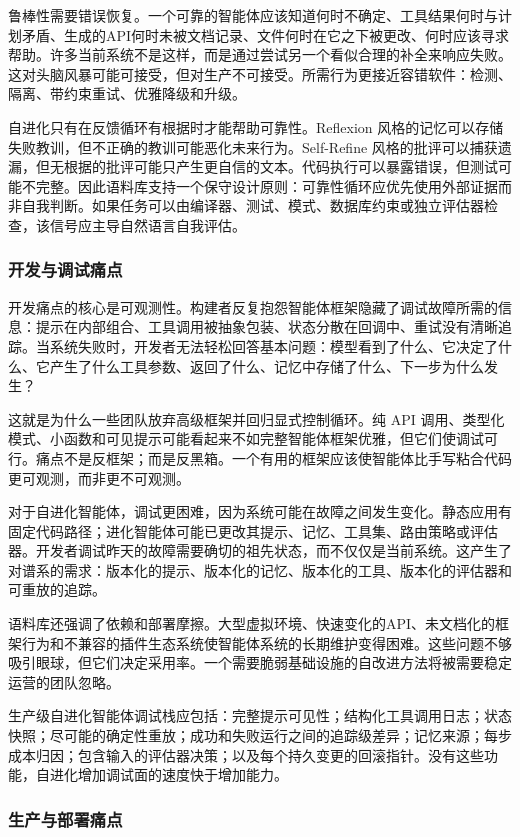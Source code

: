 鲁棒性需要错误恢复。一个可靠的智能体应该知道何时不确定、工具结果何时与计划矛盾、生成的API何时未被文档记录、文件何时在它之下被更改、何时应该寻求帮助。许多当前系统不是这样，而是通过尝试另一个看似合理的补全来响应失败。这对头脑风暴可能可接受，但对生产不可接受。所需行为更接近容错软件：检测、隔离、带约束重试、优雅降级和升级。

自进化只有在反馈循环有根据时才能帮助可靠性。Reflexion 风格的记忆可以存储失败教训，但不正确的教训可能恶化未来行为。Self-Refine 风格的批评可以捕获遗漏，但无根据的批评可能只产生更自信的文本。代码执行可以暴露错误，但测试可能不完整。因此语料库支持一个保守设计原则：可靠性循环应优先使用外部证据而非自我判断。如果任务可以由编译器、测试、模式、数据库约束或独立评估器检查，该信号应主导自然语言自我评估。

\subsubsection{开发与调试痛点}
\label{sec:ch7-debugging-english}

开发痛点的核心是可观测性。构建者反复抱怨智能体框架隐藏了调试故障所需的信息：提示在内部组合、工具调用被抽象包装、状态分散在回调中、重试没有清晰追踪。当系统失败时，开发者无法轻松回答基本问题：模型看到了什么、它决定了什么、它产生了什么工具参数、返回了什么、记忆中存储了什么、下一步为什么发生？

这就是为什么一些团队放弃高级框架并回归显式控制循环。纯 API 调用、类型化模式、小函数和可见提示可能看起来不如完整智能体框架优雅，但它们使调试可行。痛点不是反框架；而是反黑箱。一个有用的框架应该使智能体比手写粘合代码更可观测，而非更不可观测。

对于自进化智能体，调试更困难，因为系统可能在故障之间发生变化。静态应用有固定代码路径；进化智能体可能已更改其提示、记忆、工具集、路由策略或评估器。开发者调试昨天的故障需要确切的祖先状态，而不仅仅是当前系统。这产生了对谱系的需求：版本化的提示、版本化的记忆、版本化的工具、版本化的评估器和可重放的追踪。

语料库还强调了依赖和部署摩擦。大型虚拟环境、快速变化的API、未文档化的框架行为和不兼容的插件生态系统使智能体系统的长期维护变得困难。这些问题不够吸引眼球，但它们决定采用率。一个需要脆弱基础设施的自改进方法将被需要稳定运营的团队忽略。

生产级自进化智能体调试栈应包括：完整提示可见性；结构化工具调用日志；状态快照；尽可能的确定性重放；成功和失败运行之间的追踪级差异；记忆来源；每步成本归因；包含输入的评估器决策；以及每个持久变更的回滚指针。没有这些功能，自进化增加调试面的速度快于增加能力。

\subsubsection{生产与部署痛点}
\label{sec:ch7-production-english}

